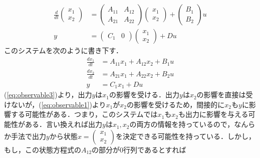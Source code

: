 \begin{align}
 \frac{d}{dt}
  \left(\begin{array}{c}
         {x}_1 \\
	 {x}_2 
	\end{array}\right)
  &=
  \left(\begin{array}{cc}
         {A}_{11} & {A}_{12} \\
	     {A}_{21} & {A}_{22}
	\end{array}\right)
  \left(\begin{array}{c}
         {x}_1 \\
	 {x}_2 
	\end{array}\right)
  +
  \left(\begin{array}{c}
         {B}_1 \\
	 {B}_2
	\end{array}\right)
  u \\
 y &=
  \left(\begin{array}{cc}
         {C}_1 & 0
	\end{array}\right)
  \left(\begin{array}{c}
         {x}_1 \\
	 {x}_2 
	\end{array}\right)
  + D u
\end{align}
このシステムを次のように書き下す．
\begin{align}
 \frac{dx_1}{dt} &= A_{11} x_1 + A_{12} x_2 + B_1 u
\label{eq:observable1} \\
 \frac{dx_2}{dt} &= A_{21} x_1 + A_{22} x_2 + B_2 u
\label{eq:observable2} \\
 y & = C_1 x_1 + Du
\label{eq:observable3}
\end{align}
(\ref{eq:observable3})より，出力$y$は$x_1$の影響を受ける．出力$y$は$x_2$の影響を直接は受けないが，(\ref{eq:observable1})より$x_1$が$x_2$の影響を受けるため，間接的に$x_2$も$y$に影響する可能性がある．つまり，このシステムでは$x_1$も$x_2$も出力に影響を与える可能性がある．言い換えれば出力$y$は$x_1,x_2$の両方の情報を持っているので，なんらか手法で出力$y$から状態$x = \left(\begin{array}{c} {x}_1 \\ {x}_2 \end{array}\right)$を決定できる可能性を持っている．しかし，もし，この状態方程式の$A_{12}$の部分が$0$行列であるとすれば

